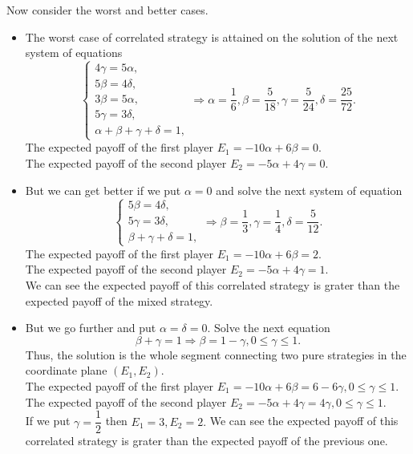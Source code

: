 \documentclass[a4paper, 12pt]{article}
\begin{document}
Now consider the worst and better cases.
\begin{itemize}
	\item The worst case of correlated strategy is attained on the solution of the next system of equations
$$
\begin{cases}
4 \gamma = 5 \alpha, \\
5 \beta = 4 \delta, \\
3 \beta = 5 \alpha, \\
5 \gamma = 3 \delta, \\
\alpha + \beta + \gamma + \delta = 1,
\end{cases}
\Rightarrow
\alpha = \dfrac{1}{6}, \beta = \dfrac{5}{18}, \gamma = \dfrac{5}{24}, \delta = \dfrac{25}{72}.
$$
The expected payoff of the first player $E_1 = -10 \alpha + 6 \beta = 0.$\\
The expected payoff of the second player $E_2 = -5 \alpha + 4 \gamma = 0.$
	\item But we can get better if we put $\alpha = 0$ and solve the next system of equation
$$
\begin{cases}
5 \beta = 4 \delta, \\
5 \gamma = 3 \delta, \\
\beta + \gamma + \delta = 1,
\end{cases}
\Rightarrow
\beta = \dfrac{1}{3}, \gamma = \dfrac{1}{4}, \delta = \dfrac{5}{12}.
$$
The expected payoff of the first player $E_1 = -10 \alpha + 6 \beta = 2.$\\
The expected payoff of the second player $E_2 = -5 \alpha + 4 \gamma = 1.$\\
We can see the expected payoff of this correlated strategy is grater than the expected payoff of the mixed strategy.
	\item But we go further and put $\alpha = \delta = 0.$ Solve the next equation
$$
\beta + \gamma = 1
\Rightarrow
\beta = 1 - \gamma, 0 \leqslant \gamma \leqslant 1.
$$
Thus, the solution is the whole segment connecting two pure strategies in the coordinate plane $(E_1, E_2).$\\
The expected payoff of the first player $E_1 = -10 \alpha + 6 \beta = 6 - 6 \gamma, 0 \leqslant \gamma \leqslant 1.$\\
The expected payoff of the second player $E_2 = -5 \alpha + 4 \gamma = 4 \gamma, 0 \leqslant \gamma \leqslant 1.$\\
If we put $\gamma = \dfrac{1}{2}$ then $E_1 = 3, E_2 = 2.$ We can see the expected payoff of this correlated strategy is grater than the expected payoff of the previous one.
\end{itemize}
\end{document}
